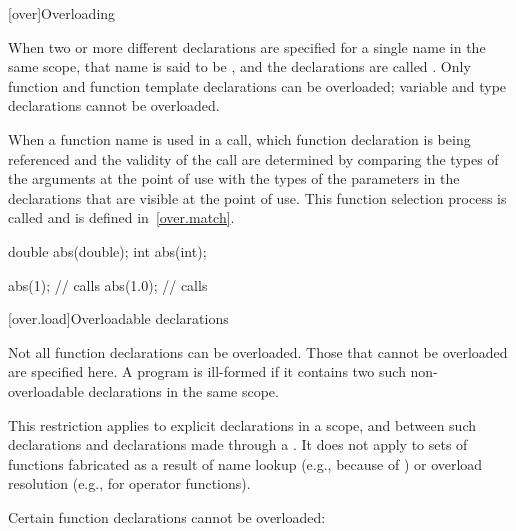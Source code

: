 [over]{Overloading}%


\pnum
{}%
%
When two or more different declarations are specified for a single name
in the same scope, that name is said to be
,
and the declarations
are called
.
Only function and function template
declarations can be overloaded; variable and type declarations
cannot be overloaded.

\pnum
When a function name is used in a call, which function
declaration is being referenced and the validity of the call
are determined by comparing the types
of the arguments at the point of use with the types of the parameters
in the declarations that are visible at the point of use.
This function selection process is called
 and is defined in~\ref{over.match}.
\begin{example}

%
\begin{codeblock}
double abs(double);
int abs(int);

abs(1);             // calls 
abs(1.0);           // calls 
\end{codeblock}
\end{example}

[over.load]{Overloadable declarations}
%

\pnum
{}%
Not all function declarations can be overloaded.
Those that cannot be
overloaded are specified here.
A program is ill-formed if it contains
two such non-overloadable declarations in the same scope.
\begin{note}
This restriction applies to explicit declarations in a scope, and between
such declarations and
declarations made through a
.
It does not apply to sets of functions fabricated as a result of
name lookup (e.g., because of
)
or overload resolution
(e.g., for operator functions).
\end{note}

\pnum
Certain function declarations cannot be overloaded:

